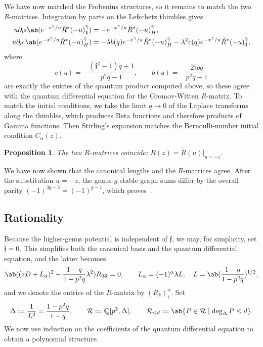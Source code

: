 \documentclass{amsart}
\newtheorem{prop}[thm]{Proposition}
\theoremstyle{definition}
\theoremstyle{remark}
\theoremstyle{plain}
\theoremstyle{definition}
\theoremstyle{remark}
\newcommand{\Q}{\mathbb{Q}}
\newcommand{\mc}[1]{\mathcal{#1}}
\newcommand{\mf}[1]{\mathfrak{#1}}
\newcommand{\1}{\mathbf{1}}
\newcommand{\2}{\mathbf{2}}
\newcommand{\3}{\mathbf{3}}
\begin{document}
We have now matched the Frobenius structures, so it remains to match the two \(R\)-matrices. Integration by parts on the Lefschetz thimbles gives
\begin{align*}
    u \partial_{t^0}\ab(e^{-x^{\gamma}/u}\check{R}^*(-u)^{\bar{\gamma}}_{\1}) &= -e^{-x^{\gamma}/u}\check{R}^*(-u)^{\bar{\gamma}}_H, \\
    u\partial_{t^0}\ab(e^{-x^{\gamma}/u}\check{R}^*(-u)^{\bar{\gamma}}_H) &= -\lambda b(q)e^{-x^{\gamma}/u}\check{R}^*(-u)^{\bar{\gamma}}_H - \lambda^2 c(q) e^{-x^{\gamma}/u}\check{R}^*(-u)^{\bar{\gamma}}_{\1},
\end{align*}
where
\[ c(q) = -\frac{(\mf{f}^2-1)q+1}{p^2q-1}, \qquad b(q) = -\frac{2\mf{f}pq}{p^2q-1} \]
are exactly the entries of the quantum product computed above, so these agree with the quantum differential equation for the Gromov-Witten \(R\)-matrix. To match the initial conditions, we take the limit \(q \to 0\) of the Laplace transforms along the thimbles, which produces Beta functions and therefore products of Gamma functions. Then Stirling's expansion matches the Bernoulli-number initial condition \(C_{\alpha}(z)\).

\begin{prop}%
\label{prop:R matrices coincide}
    The two \(R\)-matrices coincide: \(R(z) = \check{R}(u)|_{u=-z}\).
\end{prop}

We have now shown that the canonical lengths and the \(R\)-matrices agree. After the substitution \(u = -z\), the genus-\(g\) stable graph sums differ by the overall parity \((-1)^{3g-3} = (-1)^{g-1}\), which proves~.

\subsection{Rationality}%
\label{sub:Rationality}

Because the higher-genus potential is independent of \(\mf{f}\), we may, for simplicity, set \(\mf{f} = 0\). This simplifies both the canonical basis and the quantum differential equation, and the latter becomes
\[ \ab((zD+L_{\alpha})^2 - \frac{1-q}{1-p^2q}\lambda^2)R_{0\bar{\alpha}} = 0, \qquad L_{\alpha} = (-1)^{\alpha}\lambda L, \quad L = \ab(\frac{1-q}{1-p^2q})^{1/2}, \]
and we denote the entries of the \(R\)-matrix by \((R_k)_i^{\alpha}\). Set
\[ \Delta \coloneqq \frac{1}{L^2} = \frac{1-p^2q}{1-q}, \qquad \mc{R} \coloneqq \Q[p^2,\Delta], \qquad \mc{R}_{\leq d} \coloneqq \ab\{P \in \mc{R} \mid \deg_{\Delta} P \leq d\}. \]
We now use induction on the coefficients of the quantum differential equation to obtain a polynomial structure.
\end{document}
